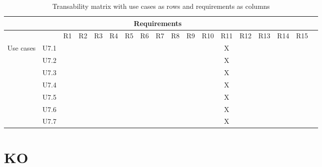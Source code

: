 \documentclass[hidelinks, 12pt, a4paper]{article}
\begin{document}
\begin{table}[H]
      \centering
      \begin{tabular}{|l|l|l|c|c|c|c|c|c|c|c|c|c|c|c|c|c|c|}
            \hline

            \multicolumn{17}{|c|}{Requirements}                                                      \\ \hline
             &      & R1 & R2 & R3 & R4 & R5 & R6 & R7 & R8 & R9 & R10 & R11 & R12 & R13 & R14 & R15 \\ \hline
            \multirow{7}{*}{Use cases}

             & U7.1 &    &    &    &    &    &    &    &    &    &     & X   &     &     &     &     \\ \cline{2-17}
             & U7.2 &    &    &    &    &    &    &    &    &    &     & X   &     &     &     &     \\ \cline{2-17}
             & U7.3 &    &    &    &    &    &    &    &    &    &     & X   &     &     &     &     \\ \cline{2-17}
             & U7.4 &    &    &    &    &    &    &    &    &    &     & X   &     &     &     &     \\ \cline{2-17}
             & U7.5 &    &    &    &    &    &    &    &    &    &     & X   &     &     &     &     \\ \cline{2-17}
             & U7.6 &    &    &    &    &    &    &    &    &    &     & X   &     &     &     &     \\ \cline{2-17}
             & U7.7 &    &    &    &    &    &    &    &    &    &     & X   &     &     &     &     \\ \cline{1-17}
      \end{tabular}
      \vspace{1cm}
      \caption{Transability matrix with use cases as rows and requirements as columns}
      \label{table:ContinuedCould-haveRequirementsTraceabilityMatrix}
\end{table}

\newpage
\section{KO}
\end{document}
